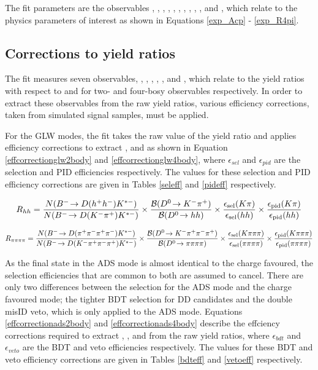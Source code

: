 The \CP fit parameters are the \CP observables \Akpi, \Akk, \Apipi, \Rkk, \Rpipi, \Rptwo, \Rmtwo, \Akpipipi, \Apipipipi, \Rpipipipi, \Rpfour and \Rmfour, which relate to the physics parameters of interest as shown in Equations \ref{exp_Acp} - \ref{exp_R4pi}.

\subsection{Corrections to yield ratios}
\label{sec:cpfit:efficiencies}

The \CP fit measures seven \CP observables, \Rkk, \Rpipi, \Rptwo, \Rmtwo, \Rpipipipi, \Rpfour and \Rmfour, which relate to the yield ratios with respect to \decay{\Bm}{\D(\Km\pip)\Kstarm} and \decay{\Bm}{\D(\Km\pip\pim\pip)\Kstarm} for two- and four-bosy observables respectively. In order to extract these \CP observables from the raw yield ratios, various efficiency corrections, taken from simulated signal samples, must be applied.

For the GLW modes, the fit takes the raw value of the yield ratio and applies efficiency corrections to extract \Rkk, \Rpipi and \Rpipipipi as shown in Equation \ref{effcorrectionglw2body} and \ref{effcorrectionglw4body}, where $\epsilon_{sel}$ and $\epsilon_{pid}$ are the selection and PID efficiencies respectively. The values for these selection and PID efficiency corrections are given in Tables \ref{seleff} and \ref{pideff} respectively.

{\footnotesize
\begin{equation}
R_{hh} = \frac{N({{{B}^-}}\!\rightarrow {\ensuremath{D}}(h^+h^-){{K}^{*-}})}{N({{{B}^-}}\!\rightarrow {\ensuremath{D}}({{K}^-}{{\pi}^+}){{K}^{*-}})} \times \frac{{\mathcal{B}}({{D}^0}\!\rightarrow {\ensuremath{{K}^-}}{\ensuremath{{\pi}^+}})}{{\mathcal{B}}({{D}^0}\!\rightarrow hh)} \times \frac{\epsilon_{\text{sel}}(K\pi)}{\epsilon_{\text{sel}}(hh)} \times \frac{\epsilon_{\text{pid}}(K\pi)}{\epsilon_{\text{pid}}(hh)}
\label{effcorrectionglw2body}
\end{equation}

\begin{equation}
R_{\pi\pi\pi\pi} = \frac{N({{{B}^-}}\!\rightarrow {\ensuremath{D}}({{\pi}^+}{{\pi}^-}{{\pi}^+}{{\pi}^-}){{K}^{*-}})}{N({{{B}^-}}\!\rightarrow {\ensuremath{D}}({{K}^-}{{\pi}^+}{{\pi}^-}{{\pi}^+}){{K}^{*-}})} \times \frac{{\mathcal{B}}({{D}^0}\!\rightarrow {\ensuremath{{K}^-}}{\ensuremath{{\pi}^+}}{\ensuremath{{\pi}^-}}{\ensuremath{{\pi}^+}})}{{\mathcal{B}}({{D}^0}\!\rightarrow \pi\pi\pi\pi)} \times \frac{\epsilon_{\text{sel}}(K\pi\pi\pi)}{\epsilon_{\text{sel}}(\pi\pi\pi\pi)} \times \frac{\epsilon_{\text{pid}}(K\pi\pi\pi)}{\epsilon_{\text{pid}}(\pi\pi\pi\pi)} 
\label{effcorrectionglw4body}
\end{equation}}

As the final state in the ADS mode is almost identical to the charge favoured, the selection efficiencies that are common to both are assumed to cancel. There are only two differences between the selection for the ADS mode and the charge favoured mode; the tighter BDT selection for DD candidates and the double misID veto, which is only applied to the ADS mode. Equations \ref{effcorrectionads2body} and \ref{effcorrectionads4body} describe the effciency corrections required to extract \Rptwo, \Rmtwo, \Rpfour and \Rmfour from the raw yield ratios, where $\epsilon_{bdt}$ and $\epsilon_{veto}$ are the BDT and veto efficiencies respectively. The values for these BDT and veto efficiency corrections are given in Tables \ref{bdteff} and \ref{vetoeff} respectively.

